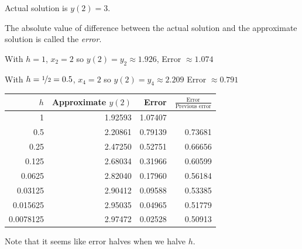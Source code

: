 \documentclass[10pt,aspectratio=169]{beamer}
\begin{document}
\begin{frame}
Actual solution is $y(2) = 3$.

\medskip
\pause

The absolute value of difference between the actual solution and the approximate solution is
called the \emph{error}.

\medskip
\pause

With $h=1$, $x_2=2$ so $y(2) = y_2 \approx 1.926$, 
\quad
\pause
Error ${}\approx 1.074$

\medskip
\pause

With $h=\nicefrac{1}{2} = 0.5$, $x_4=2$ so $y(2) = y_4 \approx 2.209$
\quad
\pause
Error ${}\approx 0.791$

\medskip
\pause

\hspace*{\fill}
\begin{tabular}{@{}rrrr@{}}
\toprule
$h$ & Approximate $y(2)$ & Error & $\frac{\text{Error}}{\text{Previous error}}$ \\
\midrule
1        & 1.92593 & 1.07407 & \\
0.5      & 2.20861 & 0.79139 & 0.73681 \\
0.25     & 2.47250 & 0.52751 & 0.66656 \\
0.125    & 2.68034 & 0.31966 & 0.60599 \\
0.0625   & 2.82040 & 0.17960 & 0.56184 \\
0.03125  & 2.90412 & 0.09588 & 0.53385 \\
0.015625 & 2.95035 & 0.04965 & 0.51779 \\
0.0078125& 2.97472 & 0.02528 & 0.50913 \\
\bottomrule
\end{tabular}
\hspace*{\fill}

\medskip
\pause

Note that it seems like error halves when we halve $h$.

\end{frame}
\end{document}
